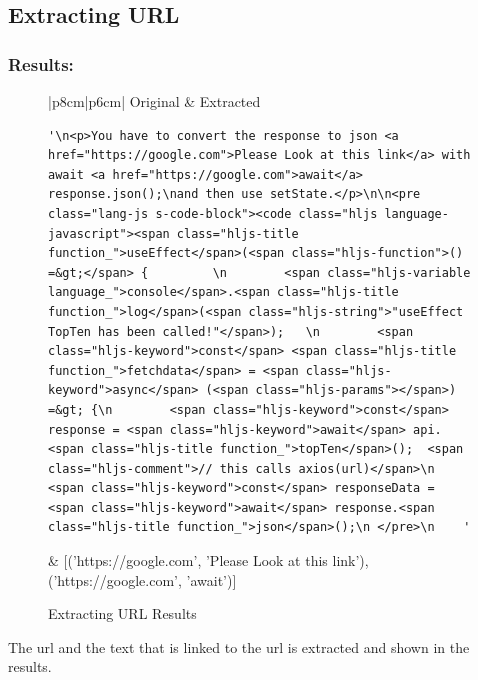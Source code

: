 \subsection{Extracting URL} \label{extracting-url_results}
\subsubsection{Results:} \label{extracting-url_results_results}

\newpage
\begin{figure}[H]
  \begin{center}
    \begin{tabular}{|p{8cm}|p{6cm}|}
    \hline\hline
    Original & Extracted \\ [0.5ex] %
    \hline 
    \begin{lstlisting}[frame=none]
'\n<p>You have to convert the response to json <a href="https://google.com">Please Look at this link</a> with await <a href="https://google.com">await</a> response.json();\nand then use setState.</p>\n\n<pre class="lang-js s-code-block"><code class="hljs language-javascript"><span class="hljs-title function_">useEffect</span>(<span class="hljs-function">() =&gt;</span> {         \n        <span class="hljs-variable language_">console</span>.<span class="hljs-title function_">log</span>(<span class="hljs-string">"useEffect TopTen has been called!"</span>);   \n        <span class="hljs-keyword">const</span> <span class="hljs-title function_">fetchdata</span> = <span class="hljs-keyword">async</span> (<span class="hljs-params"></span>) =&gt; {\n        <span class="hljs-keyword">const</span> response = <span class="hljs-keyword">await</span> api.<span class="hljs-title function_">topTen</span>();  <span class="hljs-comment">// this calls axios(url)</span>\n        <span class="hljs-keyword">const</span> responseData = <span class="hljs-keyword">await</span> response.<span class="hljs-title function_">json</span>();\n </pre>\n    '
    \end{lstlisting} & [('https://google.com', 'Please Look at this link'), ('https://google.com', 'await')] \\ 
  
    \hline 
    \end{tabular}
  \end{center}
  \caption{Extracting URL Results}
  \label{fig:extracting-url_results_results}
\end{figure}

The url and the text that is linked to the url is extracted and shown in the results.

